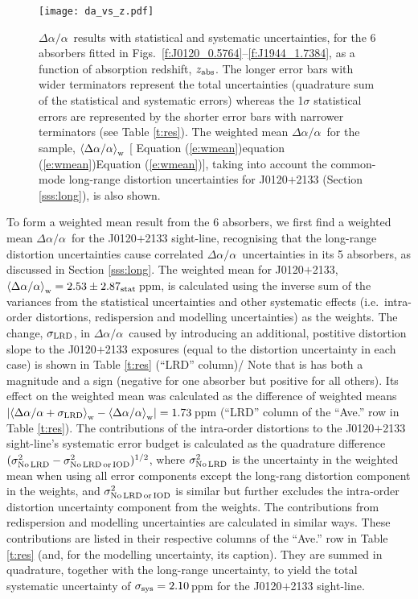 \documentclass[fleqn,usenatbib,usedcolumn]{mnras}
\newcommand{\Sref}[1]{Section \ref{#1}}
\newcommand{\Tref}[1]{Table \ref{#1}}
\newcommand{\Eref}[1]{\ifhmode \ifnum\spacefactor=1001 Equation (\ref{#1})\else equation (\ref{#1})\fi \else Equation (\ref{#1})\fi}
\newcommand{\zab}{\ensuremath{z_\textrm{\scriptsize abs}}}
\newcommand{\daa}{\ensuremath{\Delta\alpha/\alpha}}
\begin{document}
\begin{figure}
\begin{center}
\texttt{[image: da\_vs\_z.pdf]}\vspace{-1em}
 \caption{\daa\ results with statistical and systematic uncertainties, for the 6 absorbers fitted in Figs.\ \ref{f:J0120_0.5764}--\ref{f:J1944_1.7384}, as a function of absorption redshift, \zab. The longer error bars with wider terminators represent the total uncertainties (quadrature sum of the statistical and systematic errors) whereas the 1$\sigma$ statistical errors are represented by the shorter error bars with narrower terminators (see \Tref{t:res}). The weighted mean \daa\ for the sample, $\left<\daa\right>_{\rm w}$ [\Eref{e:wmean}], taking into account the common-mode long-range distortion uncertainties for J0120$+$2133 (\Sref{sss:long}), is also shown.}
\label{f:da_vs_z}
\end{center}
\end{figure}

To form a weighted mean result from the 6 absorbers, we first find a weighted mean \daa\ for the J0120$+$2133 sight-line, recognising that the long-range distortion uncertainties cause correlated \daa\ uncertainties in its 5 absorbers, as discussed in \Sref{sss:long}. The weighted mean for J0120$+$2133, $\left<\daa\right>_{\rm w}=2.53\pm2.87_{\rm stat}$\,ppm, is calculated using the inverse sum of the variances from the statistical uncertainties and other systematic effects (i.e.\ intra-order distortions, redispersion and modelling uncertainties) as the weights. The change, $\sigma_{\rm LRD}$, in \daa\ caused by introducing an additional, postitive distortion slope to the J0120$+$2133 exposures (equal to the distortion uncertainty in each case) is shown in \Tref{t:res} (``LRD'' column)/ Note that is has both a magnitude and a sign (negative for one absorber but positive for all others). Its effect on the weighted mean was calculated as the difference of weighted means $\left|\left<\daa+\sigma_{\rm LRD}\right>_{\rm w}-\left<\daa\right>_{\rm w}\right|=1.73$\,ppm (``LRD'' column of the ``Ave.'' row in \Tref{t:res}). The contributions of the intra-order distortions to the J0120$+$2133 sight-line's systematic error budget is calculated as the quadrature difference $(\sigma^2_{\rm No\,LRD}-\sigma^2_{\rm No\,LRD\,or\,IOD})^{1/2}$, where $\sigma^2_{\rm No\,LRD}$ is the uncertainty in the weighted mean when using all error components except the long-rang distortion component in the weights, and $\sigma^2_{\rm No\,LRD\,or\,IOD}$ is similar but further excludes the intra-order distortion uncertainty component from the weights. The contributions from redispersion and modelling uncertainties are calculated in similar ways. These contributions are listed in their respective columns of the ``Ave.'' row in \Tref{t:res} (and, for the modelling uncertainty, its caption). They are summed in quadrature, together with the long-range uncertainty, to yield the total systematic uncertainty of $\sigma_{\rm sys}=2.10$\,ppm for the J0120$+$2133 sight-line.
\end{document}
